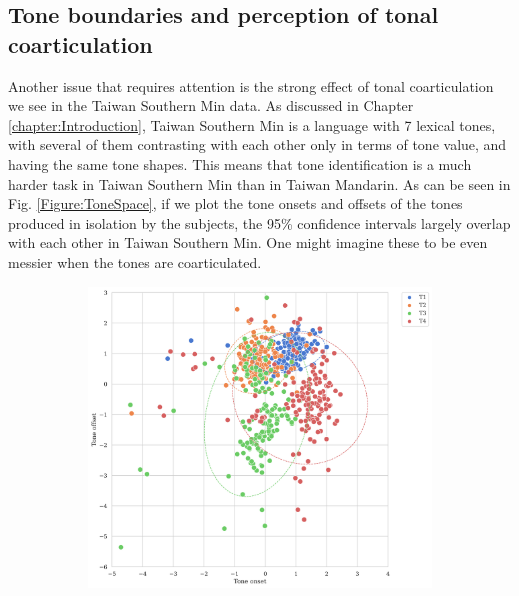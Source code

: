 \documentclass[12pt]{report}
\begin{document}
\begin{CJK}{UTF8}{bsmi}
\section{Tone boundaries and perception of tonal coarticulation}
Another issue that requires attention is the strong effect of tonal coarticulation we see in the Taiwan Southern Min data. As discussed in Chapter \ref{chapter:Introduction}, Taiwan Southern Min is a language with 7 lexical tones, with several of them contrasting with each other only in terms of tone value, and having the same tone shapes. This means that tone identification is a much harder task in Taiwan Southern Min than in Taiwan Mandarin. As can be seen in Fig. \ref{Figure:ToneSpace}, if we plot the tone onsets and offsets of the tones produced in isolation by the subjects, the 95\% confidence intervals largely overlap with each other in Taiwan Southern Min. One might imagine these to be even messier when the tones are coarticulated.
\begin{figure}[hbt!]
\centering
\begin{subfigure}[b]{.8\textwidth}
\centering
\includegraphics[width=\textwidth]{Figures/Tone_space_Mandarin.png}
\end{subfigure}
\begin{subfigure}[b]{.8\textwidth}
\centering

\end{subfigure}
\end{figure}
\end{CJK}
\end{document}
